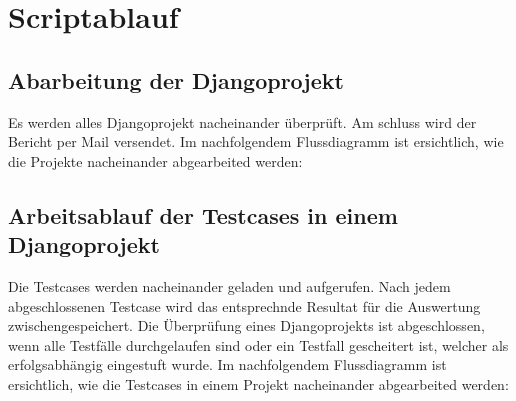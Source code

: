 \section{Scriptablauf}
\subsection{Abarbeitung der Djangoprojekt}
Es werden alles Djangoprojekt nacheinander überprüft. Am schluss wird der Bericht per Mail versendet.
Im nachfolgendem Flussdiagramm ist ersichtlich, wie die Projekte nacheinander abgearbeited werden: \\

\subsection{Arbeitsablauf der Testcases in einem Djangoprojekt}
Die Testcases werden nacheinander geladen und aufgerufen. Nach jedem abgeschlossenen Testcase wird das entsprechnde Resultat für die Auswertung zwischengespeichert. 
Die Überprüfung eines Djangoprojekts ist abgeschlossen, wenn alle Testfälle durchgelaufen sind oder ein Testfall gescheitert ist, welcher als erfolgsabhängig eingestuft wurde. 
Im nachfolgendem Flussdiagramm ist ersichtlich, wie die Testcases in einem Projekt nacheinander abgearbeited werden: \\ 

